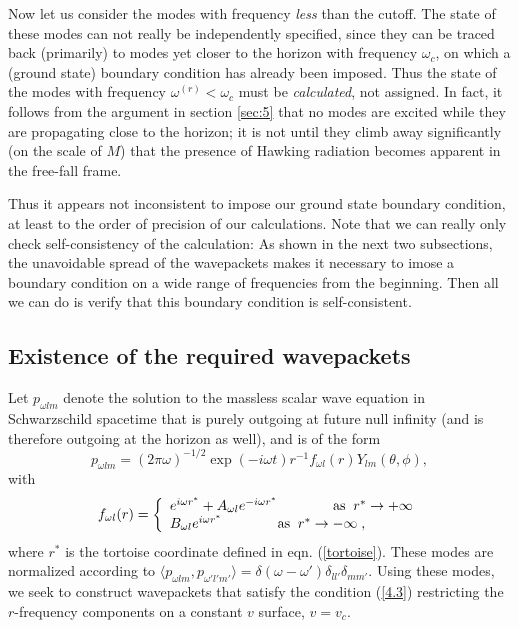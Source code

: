 \documentclass[12pt]{article}
\def\o{\omega}
\def\la{\langle}
\def\ra{\rangle}
\begin{document}
Now let us consider the modes with frequency {\it less} than
the cutoff. The state of these modes can not really be
independently specified, since they can be traced back
(primarily) to modes yet closer to the horizon with
frequency $\o_c$, on which a (ground state) boundary
condition has already been imposed. Thus the state of the
modes with frequency $\o^{(r)}<\o_c$ must be {\it calculated},
not assigned. In fact, it follows from the argument in
section \ref{sec:5} that no modes are excited while they are
propagating close to the horizon; it is not until they climb
away significantly (on the scale of $M$) that the presence
of Hawking radiation becomes apparent in the free-fall
frame.

Thus it appears not inconsistent to impose our
ground state boundary condition, at least to the order of precision
of our calculations. Note that we can really only check
self-consistency of the calculation: As shown in the next
two subsections, the unavoidable spread of the wavepackets
makes it necessary to imose a boundary condition on a wide
range of frequencies from the beginning. Then all we can do
is verify that this boundary condition is self-consistent.

\subsection{Existence of the required wavepackets}
\label{subsec:existence}

Let $p_{\o lm}$ denote the solution to the massless scalar
wave equation in Schwarzschild spacetime
that is purely outgoing at future null infinity
(and is therefore outgoing at the horizon as well), and is of
the form
\begin{equation}
p_{\o lm}=(2\pi\omega)^{-1/2}
\exp(-i\o t) r^{-1}f_{\omega l}(r)
Y_{lm}(\theta,\phi),
\end{equation}
with
\begin{equation}
f_{\o l}(r)=\left\{
\begin{array}{l}
e^{i\o r^*}+A_{\o l}e^{-i\o r^*}\qquad\qquad
{\rm as}\; \;  r^*\rightarrow +\infty\\
B_{\o l}e^{i\o r^*}\qquad\qquad {\rm as}\; \;
r^*\rightarrow -\infty\; ,
\end{array}\right.
\end{equation}
where $r^*$ is the tortoise coordinate defined in eqn.
(\ref{tortoise}). These modes are normalized according to
$\la p_{\o lm},p_{\o' l'm'}\ra =
\delta(\o-\o')\delta_{ll'}\delta_{mm'}$.
Using these modes, we seek to construct wavepackets that
satisfy the condition (\ref{4.3}) restricting the $r$-frequency
components on a constant $v$ surface, $v=v_c$.
\end{document}
